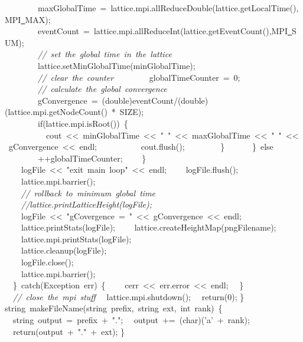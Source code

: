 {\ \ \ \ \ \ \ \ maxGlobalTime\ =\ lattice.mpi.allReduceDouble(lattice.getLocalTime(),MPI\underline\ MAX);
\ \ \ \ \ \ \ \ eventCount\ =\ lattice.mpi.allReduceInt(lattice.getEventCount(),MPI\underline\ SUM);
\ \\
\ \ \ \ \ \ \ \ \textsl{//\ set\ the\ global\ time\ in\ the\ lattice}
\ \ \ \ \ \ \ \ lattice.setMinGlobalTime(minGlobalTime);
\ \\
\ \ \ \ \ \ \ \ \textsl{//\ clear\ the\ counter}
\ \ \ \ \ \ \ \ globalTimeCounter\ =\ 0;
\ \\
\ \ \ \ \ \ \ \ \textsl{//\ calculate\ the\ global\ convergence}
\ \ \ \ \ \ \ \ gConvergence\ =\ (double)eventCount/(double)(lattice.mpi.getNodeCount()\ *\ SIZE);
\ \\
\ \ \ \ \ \ \ \ if(lattice.mpi.isRoot())\ \{
\ \ \ \ \ \ \ \ \ \ cout\ <{}<{}\ minGlobalTime\ <{}<{}\ "{}\ "{}\ <{}<{}\ maxGlobalTime\ <{}<{}\ "{}\ "{}\ <{}<{}\ gConvergence\ <{}<{}\ endl;
\ \ \ \ \ \ \ \ \ \ cout.flush();
\ \ \ \ \ \ \ \ \}
\ \ \ \ \ \ \}\ else
\ \ \ \ \ \ \ \ ++globalTimeCounter;
\ \ \ \ \}
\ \\
\ \ \ \ logFile\ <{}<{}\ "{}exit\ main\ loop"{}\ <{}<{}\ endl;
\ \ \ \ logFile.flush();
\ \\
\ \ \ \ lattice.mpi.barrier();
\ \\
\ \ \ \ \textsl{//\ rollback\ to\ minimum\ global\ time}
\ \\
\ \ \ \ \textsl{//lattice.printLatticeHeight(logFile);}
\ \ \ \ logFile\ <{}<{}\ "{}gCovergence\ =\ "{}\ <{}<{}\ gConvergence\ <{}<{}\ endl;
\ \ \ \ lattice.printStats(logFile);
\ \ \ \ lattice.createHeightMap(pngFilename);
\ \ \ \ lattice.mpi.printStats(logFile);
\ \\
\ \ \ \ lattice.cleanup(logFile);
\ \\
\ \ \ \ logFile.close();
\ \\
\ \ \ \ lattice.mpi.barrier();
\ \\
\ \ \}\ catch(Exception\ err)\ \{
\ \ \ \ cerr\ <{}<{}\ err.error\ <{}<{}\ endl;
\ \ \}
\ \\
\ \ \textsl{//\ close\ the\ mpi\ stuff}
\ \ lattice.mpi.shutdown();
\ \ return(0);
\}
\ \\
string\ makeFileName(string\ prefix,\ string\ ext,\ int\ rank)\ \{
\ \ string\ output\ =\ prefix\ +\ "{}."{};
\ \ output\ +=\ (char)('a'\ +\ rank);
\ \ return(output\ +\ "{}."{}\ +\ ext);
\}
\ \\
 }
\normalfont\normalsize


